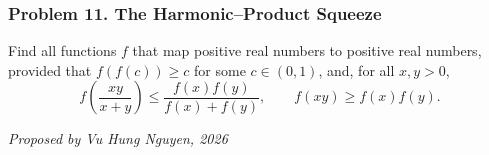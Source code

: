 \subsubsection*{Problem 11. The Harmonic--Product Squeeze}

\begin{exercisebox}[hard]

Find all functions $f$ that map positive real numbers to positive real
numbers, provided that $f(f(c))\geq c$ for some $c\in(0,1)$, and, for
all $x,y>0$,
\[
f\!\left(\frac{xy}{x+y}\right)
\leq\frac{f(x)f(y)}{f(x)+f(y)},
\qquad
f(xy)\geq f(x)f(y).
\]

\begin{flushright}
\textit{Proposed by Vu Hung Nguyen, 2026}
\end{flushright}


\end{exercisebox}